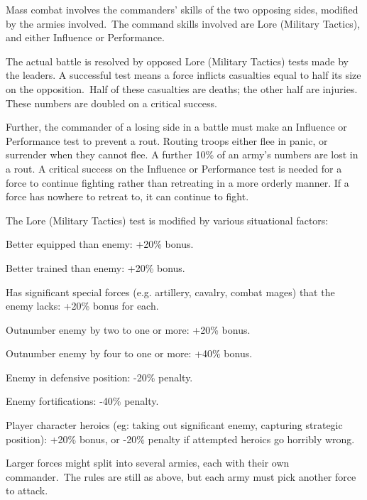 Mass combat involves the commanders’ skills of the two opposing sides, modified by the armies involved. The command skills involved are Lore (Military Tactics), and either Influence or Performance.

The actual battle is resolved by opposed Lore (Military Tactics) tests made by the leaders. A successful test means a force inflicts casualties equal to half its size on the opposition. Half of these casualties are deaths; the other half are injuries. These numbers are doubled on a critical success.

Further, the commander of a losing side in a battle must make an Influence or Performance test to prevent a rout. Routing troops either flee in panic, or surrender when they cannot flee. A further 10\% of an army’s numbers are lost in a rout. A critical success on the Influence or Performance test is needed for a force to continue fighting rather than retreating in a more orderly manner. If a force has nowhere to retreat to, it can continue to fight.

The Lore (Military Tactics) test is modified by various situational factors:
\begin{rpg-list}
\item Better equipped than enemy: +20\% bonus.
\item Better trained than enemy: +20\% bonus.
\item Has significant special forces (e.g. artillery, cavalry, combat mages) that the enemy lacks: +20\% bonus for each.
\item Outnumber enemy by two to one or more: +20\% bonus.
\item Outnumber enemy by four to one or more: +40\% bonus.
\item Enemy in defensive position: -20\% penalty.
\item Enemy fortifications: -40\% penalty.
\item Player character heroics (eg: taking out significant enemy, capturing strategic position): +20\% bonus, or -20\% penalty if attempted heroics go horribly wrong.
\end{rpg-list}

Larger forces might split into several armies, each with their own commander. The rules are still as above, but each army must pick another force to attack.


